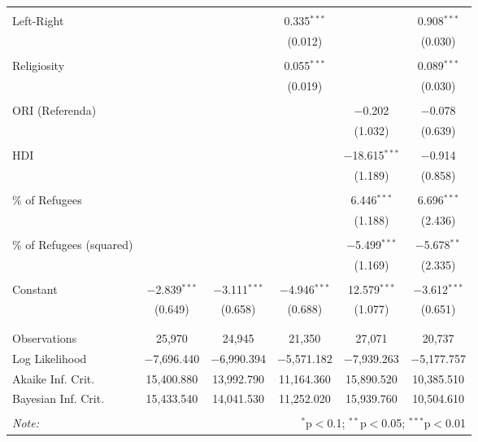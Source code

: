 \begin{table}[!htbp]
\begin{tabular}{@{\extracolsep{5pt}}lccccc}
  & & & & & \\ 
 Left-Right &  &  & 0.335$^{***}$ &  & 0.908$^{***}$ \\ 
  &  &  & (0.012) &  & (0.030) \\ 
  & & & & & \\ 
 Religiosity &  &  & 0.055$^{***}$ &  & 0.089$^{***}$ \\ 
  &  &  & (0.019) &  & (0.030) \\ 
  & & & & & \\ 
 ORI (Referenda) &  &  &  & $-$0.202 & $-$0.078 \\ 
  &  &  &  & (1.032) & (0.639) \\ 
  & & & & & \\ 
 HDI &  &  &  & $-$18.615$^{***}$ & $-$0.914 \\ 
  &  &  &  & (1.189) & (0.858) \\ 
  & & & & & \\ 
 \% of Refugees &  &  &  & 6.446$^{***}$ & 6.696$^{***}$ \\ 
  &  &  &  & (1.188) & (2.436) \\ 
  & & & & & \\ 
 \% of Refugees (squared) &  &  &  & $-$5.499$^{***}$ & $-$5.678$^{**}$ \\ 
  &  &  &  & (1.169) & (2.335) \\ 
  & & & & & \\ 
 Constant & $-$2.839$^{***}$ & $-$3.111$^{***}$ & $-$4.946$^{***}$ & 12.579$^{***}$ & $-$3.612$^{***}$ \\ 
  & (0.649) & (0.658) & (0.688) & (1.077) & (0.651) \\ 
  & & & & & \\ 
\hline \\[-1.8ex] 
Observations & 25,970 & 24,945 & 21,350 & 27,071 & 20,737 \\ 
Log Likelihood & $-$7,696.440 & $-$6,990.394 & $-$5,571.182 & $-$7,939.263 & $-$5,177.757 \\ 
Akaike Inf. Crit. & 15,400.880 & 13,992.790 & 11,164.360 & 15,890.520 & 10,385.510 \\ 
Bayesian Inf. Crit. & 15,433.540 & 14,041.530 & 11,252.020 & 15,939.760 & 10,504.610 \\ 
\hline 
\hline \\[-1.8ex] 
\textit{Note:}  & \multicolumn{5}{r}{$^{*}$p$<$0.1; $^{**}$p$<$0.05; $^{***}$p$<$0.01} \\ 
\end{tabular} 
\end{table} 
